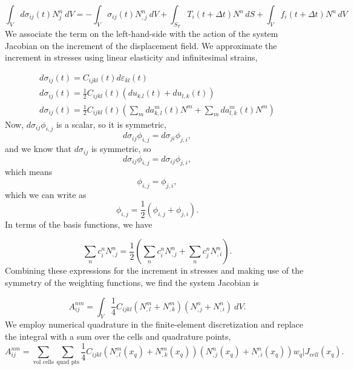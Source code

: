 \begin{equation}
\int_{V}d\sigma_{ij}(t)N_{j}^{n}\ dV=-\int_{V}\sigma_{ij}(t)N_{,j}^{n}\: dV+\int_{S_{T}}T_{i}(t+\Delta t)N^{n}\, dS+\int_{V}f_{i}(t+\Delta t)N^{n}\, dV
\end{equation}
We associate the term on the left-hand-side with the action of the
system Jacobian on the increment of the displacement field. We approximate
the increment in stresses using linear elasticity and infinitesimal
strains,

\begin{gather}
d\sigma_{ij}(t)=C_{ijkl}(t)d\varepsilon_{kl}(t)\\
d\sigma_{ij}(t)=\frac{1}{2}C_{ijkl}(t)(du_{k.l}(t)+du_{l,k}(t))\\
d\sigma_{ij}(t)=\frac{1}{2}C_{ijkl}(t)(\sum_{m}da_{k,l}^{m}(t)N^{m}+\sum_{m}da_{l,k}^{m}(t)N^{m})
\end{gather}
Now, $d\sigma_{ij}\phi_{i,j}$ is a scalar, so it is symmetric,
\begin{equation}
d\sigma_{ij}\phi_{i,j}=d\sigma_{ji}\phi_{j,i},
\end{equation}
and we know that $d\sigma_{ij}$ is symmetric, so
\begin{equation}
d\sigma_{ij}\phi_{i,j}=d\sigma_{ij}\phi_{j,i},
\end{equation}
which means
\begin{equation}
\phi_{i,j}=\phi_{j,i},
\end{equation}
which we can write as
\begin{equation}
\phi_{i,j}=\frac{1}{2}(\phi_{i,j}+\phi_{j,i}).
\end{equation}
In terms of the basis functions, we have

\begin{equation}
\sum_{n}c_{i}^{n}N_{,j}^{n}=\frac{1}{2}(\sum_{n}c_{i}^{n}N_{,j}^{n}+\sum_{n}c_{j}^{n}N_{,i}^{n}).
\end{equation}
Combining these expressions for the increment in stresses and making
use of the symmetry of the weighting functions, we find the system
Jacobian is

\begin{equation}
A_{ij}^{nm}=\int_{V}\frac{1}{4}C_{ijkl}(N_{,l}^{m}+N_{,k}^{m})(N_{,j}^{n}+N_{,i}^{n})\ dV.
\end{equation}
We employ numerical quadrature in the finite-element discretization
and replace the integral with a sum over the cells and quadrature
points,
\begin{equation}
A_{ij}^{nm}=\sum_{\text{vol cells}}\sum_{\text{quad pts}}\frac{1}{4}C_{ijkl}(N_{,l}^{m}(x_{q})+N_{,k}^{m}(x_{q}))(N_{,j}^{n}(x_{q})+N_{,i}^{n}(x_{q}))w_{q}|J_{cell}(x_{q}).
\end{equation}



